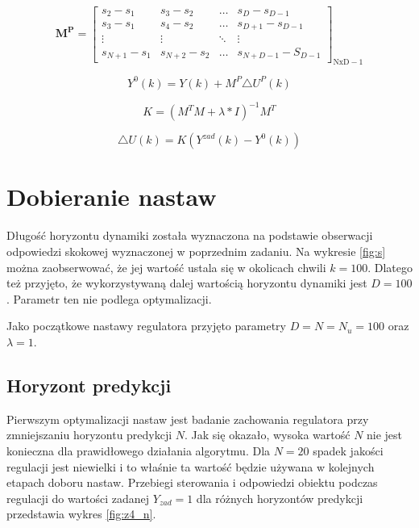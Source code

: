 \begin{equation}
\boldsymbol{M^P}=\left[
\begin{array}
{cccc}
s_{2}-s_{1} & s_{3}-s_{2} & \ldots & s_{D}-s_{D-1}\\
s_{3}-s_{1} & s_{4}-s_{2} & \ldots & s_{D+1}-s_{D-1}\\
\vdots & \vdots & \ddots & \vdots\\
s_{N+1}-s_{1} & s_{N+2}-s_{2} & \ldots &  s_{N+D-1}-S_{D-1}
\end{array}
\right]_{\mathrm{NxD-1}}
\label{MPm}
\end{equation}

\begin{equation}
Y^0(k)=Y(k)+M^P
\triangle U^P(k)
\label{Y0}
\end{equation}

\begin{equation}
K=(M^TM+\lambda*I)^{-1}M^T
\label{K}
\end{equation}

\begin{equation}
\triangle U(k)=K(Y^{zad}(k)-Y^0(k))
\label{dU1}
\end{equation}

\section{Dobieranie nastaw}
Długość horyzontu dynamiki została wyznaczona na podstawie obserwacji odpowiedzi skokowej wyznaczonej w poprzednim zadaniu. Na wykresie \ref{fig:s} można zaobserwować, że jej wartość ustala się w okolicach chwili $k=100$. Dlatego też przyjęto, że wykorzystywaną dalej wartością horyzontu dynamiki jest $D=100$. Parametr ten nie podlega optymalizacji.

Jako początkowe nastawy regulatora przyjęto parametry $D=N=N_u=100$ oraz $\lambda=1$.

\subsection{Horyzont predykcji}
 Pierwszym optymalizacji nastaw jest badanie zachowania regulatora przy zmniejszaniu horyzontu predykcji $N$. Jak się okazało, wysoka wartość $N$ nie jest konieczna dla prawidłowego działania algorytmu. Dla $N=20$ spadek jakości regulacji jest niewielki i to właśnie ta wartość będzie używana w kolejnych etapach doboru nastaw. Przebiegi sterowania i odpowiedzi obiektu podczas regulacji do wartości zadanej $Y_{zad}=1$ dla różnych horyzontów predykcji przedstawia wykres \ref{fig:z4_n}.

